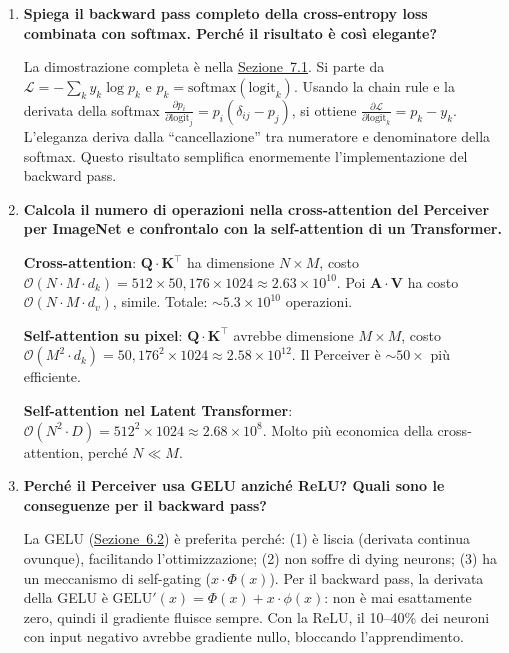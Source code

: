 \documentclass[12pt,a4paper]{article}
\begin{document}
\begin{enumerate}[resume, label=\textbf{D\arabic*.}]
\item \textbf{Spiega il backward pass completo della cross-entropy loss combinata con softmax. Perch\'e il risultato \`e cos\`i elegante?}

\begin{proofbox}
La dimostrazione completa \`e nella \hyperref[sec:grad_loss]{Sezione~7.1}. Si parte da $\mathcal{L} = -\sum_k y_k \log p_k$ e $p_k = \text{softmax}(\text{logit}_k)$. Usando la chain rule e la derivata della softmax $\frac{\partial p_i}{\partial \text{logit}_j} = p_i(\delta_{ij} - p_j)$, si ottiene $\frac{\partial \mathcal{L}}{\partial \text{logit}_k} = p_k - y_k$. L'eleganza deriva dalla ``cancellazione'' tra numeratore e denominatore della softmax. Questo risultato semplifica enormemente l'implementazione del backward pass.
\end{proofbox}

\item \textbf{Calcola il numero di operazioni nella cross-attention del Perceiver per ImageNet e confrontalo con la self-attention di un Transformer.}

\begin{proofbox}
\textbf{Cross-attention}: $\mathbf{Q} \cdot \mathbf{K}^\top$ ha dimensione $N \times M$, costo $\mathcal{O}(N \cdot M \cdot d_k) = 512 \times 50{,}176 \times 1024 \approx 2.63 \times 10^{10}$. Poi $\mathbf{A} \cdot \mathbf{V}$ ha costo $\mathcal{O}(N \cdot M \cdot d_v)$, simile. Totale: $\sim 5.3 \times 10^{10}$ operazioni.

\textbf{Self-attention su pixel}: $\mathbf{Q} \cdot \mathbf{K}^\top$ avrebbe dimensione $M \times M$, costo $\mathcal{O}(M^2 \cdot d_k) = 50{,}176^2 \times 1024 \approx 2.58 \times 10^{12}$. Il Perceiver \`e $\sim 50\times$ pi\`u efficiente.

\textbf{Self-attention nel Latent Transformer}: $\mathcal{O}(N^2 \cdot D) = 512^2 \times 1024 \approx 2.68 \times 10^{8}$. Molto pi\`u economica della cross-attention, perch\'e $N \ll M$.
\end{proofbox}

\item \textbf{Perch\'e il Perceiver usa GELU anzich\'e ReLU? Quali sono le conseguenze per il backward pass?}

\begin{proofbox}
La GELU (\hyperref[sec:gelu]{Sezione~6.2}) \`e preferita perch\'e: (1) \`e liscia (derivata continua ovunque), facilitando l'ottimizzazione; (2) non soffre di dying neurons; (3) ha un meccanismo di self-gating ($x \cdot \Phi(x)$). Per il backward pass, la derivata della GELU \`e $\text{GELU}'(x) = \Phi(x) + x \cdot \phi(x)$: non \`e mai esattamente zero, quindi il gradiente fluisce sempre. Con la ReLU, il 10--40\% dei neuroni con input negativo avrebbe gradiente nullo, bloccando l'apprendimento.
\end{proofbox}


\end{enumerate}
\end{document}
